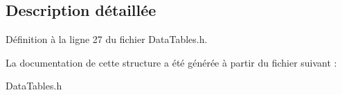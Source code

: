 \subsection{Description détaillée}


Définition à la ligne 27 du fichier Data\+Tables.\+h.



La documentation de cette structure a été générée à partir du fichier suivant \+:\begin{DoxyCompactItemize}
\item 
Data\+Tables.\+h\end{DoxyCompactItemize}
